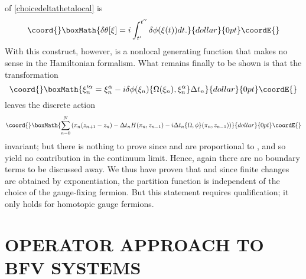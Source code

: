 \documentclass[a4paper,10pt]{article}
\begin{document}
of \eqref{choicedeltathetalocal} is  
$$\coord{}\boxMath{\delta\theta[\xi]=i\int_{t^{\prime}}^{t^{\prime\prime}}\delta\phi(\xi(t))dt.}{dollar}{0pt}\coordE{}$$ 
With this construct, however, \coordHE{} is a 
nonlocal generating function that makes no sense in the Hamiltonian formalism. What 
remains finally to be shown is that the transformation
$$\coord{}\boxMath{\xi^{\prime\alpha}_n=\xi^{\alpha}_n-
i\delta\phi(\xi_n)\{\Omega(\xi_n),\xi^{\alpha}_n\}\Delta t_n}{dollar}{0pt}\coordE{}$$
leaves the discrete action 
$$\coord{}\boxMath{\sum_{n=0}^N\left(\pi_n(z_{n+1}-z_n)-\Delta t_nH(\pi_n,z_{n-1})-i\Delta 
t_n\{\Omega,\phi\}(\pi_n,z_{n-1})\right)}{dollar}{0pt}\coordE{}$$
invariant; but there is nothing to prove since \coordHE{} and \coordHE{} are 
proportional to \coordHE{}, and so yield no contribution in the continuum limit. Hence, 
again there are no boundary terms to be discussed away. We thus have proven that 
\coordHE{} 
and since finite changes are obtained by exponentiation, the partition function is 
independent of the choice of the gauge-fixing fermion. But this statement requires  
qualification; it only holds for homotopic gauge fermions.
 
\section{OPERATOR APPROACH TO BFV SYSTEMS}
\end{document}

